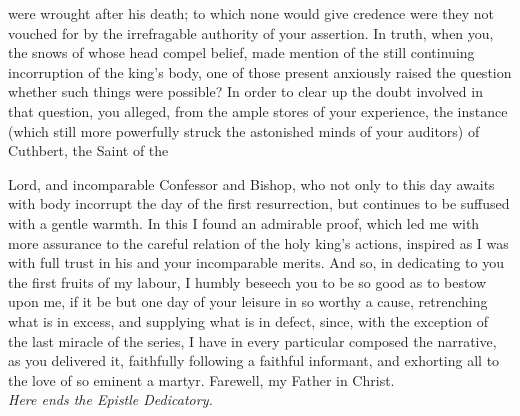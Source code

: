 \documentclass[10pt]{book}
\begin{document}
\begin{paracol}{2}
were wrought after his death; to which none would give credence were they not vouched for by the irrefragable authority of your assertion. In truth, when you, the snows of whose head compel belief, made mention of the still continuing incorruption of the king's body, one of those present anxiously raised the question whether such things were possible? In order to clear up the doubt involved in that question, you alleged, from the ample stores of your experience, the instance (which still more powerfully struck the astonished minds of your auditors) of Cuthbert, the Saint of the

\end{paracol}

\vspace{-\parskip}
Lord, and incomparable Confessor and Bishop, who not only to this day awaits with body incorrupt the day of the first resurrection, but continues to be suffused with a gentle warmth. In this I found an admirable proof, which led me with more assurance to the careful relation of the holy king's actions, inspired as I was with full trust in his and your incomparable merits. And so, in dedicating to you the first fruits of my labour, I humbly beseech you to be so good as to bestow upon me, if it be but one day of your leisure in so worthy a cause, retrenching what is in excess, and supplying what is in defect, since, with the exception of the last miracle of the series, I have in every particular composed the narrative, as you delivered it, faithfully following a faithful informant, and exhorting all to the love of so eminent a martyr. Farewell, my Father in Christ.\\{\phantom{ }\hfill\fontsize{8}{10} \selectfont\emph{Here ends the Epistle Dedicatory.}\hfill}

\cleardoublepage
\end{document}
